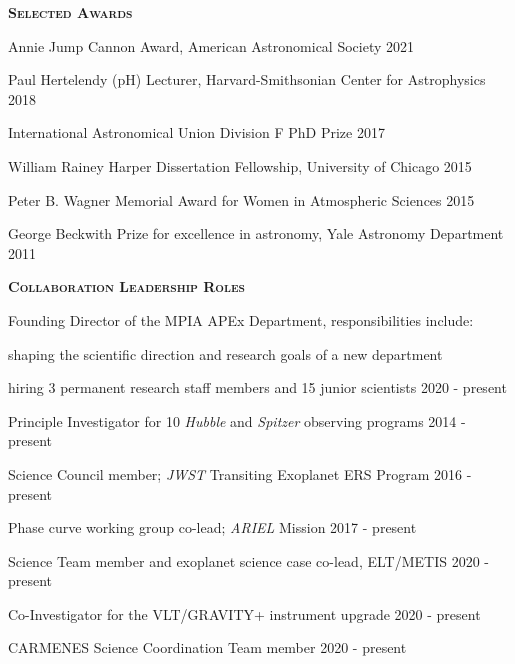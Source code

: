 \documentclass[12pt,letterpaper]{article}
\begin{document}
\textbf{\textsc{Selected Awards}}
\begin{compactitem}[]
\item Annie Jump Cannon Award, American Astronomical Society \hfill 2021
\item Paul Hertelendy (pH) Lecturer, Harvard-Smithsonian Center for Astrophysics \hfill 2018 
\item International Astronomical Union Division F PhD Prize \hfill 2017
\item William Rainey Harper Dissertation Fellowship, University of Chicago \hfill 2015
\item Peter B. Wagner Memorial Award for Women in Atmospheric Sciences \hfill 2015
\item George Beckwith Prize for excellence in astronomy, Yale Astronomy Department \hfill2011
\end{compactitem}
\vspace{6mm}


\textbf{\textsc{Collaboration Leadership Roles}}
\begin{compactitem}[]
\item Founding Director of the MPIA APEx Department, responsibilities include:
    \begin{sloppypar}
        \begin{compactitem}
        \item shaping the scientific direction and research goals of a new department
        \item hiring 3 permanent research staff members and 15 junior scientists \hfill 2020 - present
        \end{compactitem}
    \end{sloppypar}
\item Principle Investigator for 10 \emph{Hubble} and \emph{Spitzer} observing programs \hfill 2014 - present
\item Science Council member; \emph{JWST} Transiting Exoplanet ERS Program \hfill 2016 - present
\item Phase curve working group co-lead; \emph{ARIEL} Mission \hfill 2017 - present
\item Science Team member and exoplanet science case co-lead, ELT/METIS \hfill 2020 - present
\item Co-Investigator for the VLT/GRAVITY+ instrument upgrade \hfill 2020 - present
\item CARMENES Science Coordination Team member \hfill 2020 - present
\end{compactitem}
\vspace{6mm}
\end{document}
